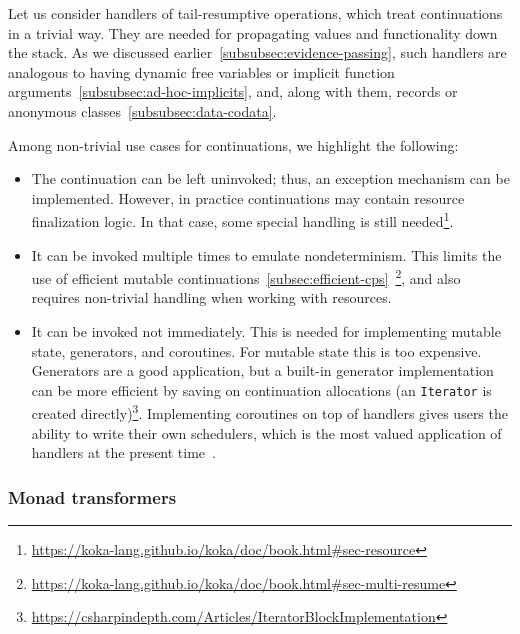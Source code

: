 Let us consider handlers of tail-resumptive operations, which treat continuations in a trivial way.
They are needed for propagating values and functionality down the stack.
As we discussed earlier~\ref{subsubsec:evidence-passing}, such handlers are analogous to having dynamic free variables or implicit function arguments~\ref{subsubsec:ad-hoc-implicits}, and, along with them, records or anonymous classes~\ref{subsubsec:data-codata}.

Among non-trivial use cases for continuations, we highlight the following:
\begin{itemize}
    \item The continuation can be left uninvoked; thus, an exception mechanism can be implemented.
    However, in practice continuations may contain resource finalization logic.
    In that case, some special handling is still needed\footnote{\url{https://koka-lang.github.io/koka/doc/book.html\#sec-resource}}.
    \item It can be invoked multiple times to emulate nondeterminism.
    This limits the use of efficient mutable continuations~\ref{subsec:efficient-cps}~\cite{leijen2018algebraic}\footnote{\url{https://koka-lang.github.io/koka/doc/book.html\#sec-multi-resume}}, and also requires non-trivial handling when working with resources.
    \item It can be invoked not immediately.
    This is needed for implementing mutable state, generators, and coroutines.
    For mutable state this is too expensive.
    Generators are a good application, but a built-in generator implementation can be more efficient by saving on continuation allocations (an \texttt{Iterator} is created directly)\footnote{\url{https://csharpindepth.com/Articles/IteratorBlockImplementation}}.
    Implementing coroutines on top of handlers gives users the ability to write their own schedulers, which is the most valued application of handlers at the present time~\cite{sivaramakrishnan2021retrofitting, phipps2023continuing}. %
\end{itemize}

\subsubsection{Monad transformers} \label{subsubsec:monad-transformers}

